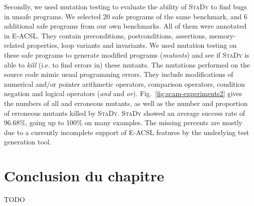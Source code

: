 Secondly, we used  mutation testing to evaluate the ability of \textsc{StaDy} to
find bugs in unsafe programs. %
We selected 20 safe programs of the same benchmark, and 6
additional safe programs from our own benchmarks. All of them were annotated in
\textsc{E-ACSL}. They contain preconditions, postconditions, assertions,
memory-related properties, loop variants and invariants. We used mutation testing
on these safe programs to generate modified programs (\emph{mutants}) and see if
\textsc{StaDy} is able to \emph{kill} 
(i.e. to find errors in) these mutants. The
mutations performed on the source code mimic usual programming errors. They
include modifications of numerical and/or pointer arithmetic operators,
comparison operators, condition negation and logical operators ({\em and} and
{\em or}). Fig.~\ref{fig:scam-experiments2} gives the 
numbers of all and erroneous mutants, as well as 
the number and proportion of erroneous mutants killed by \textsc{StaDy}. 
\textsc{StaDy} showed 
an average success rate of 96.68\%, going up to 100\% on many examples.
The missing percents are mostly due to 
a currently incomplete support of \textsc{E-ACSL} features
by the underlying test generation tool.


\section*{Conclusion du chapitre}


TODO
